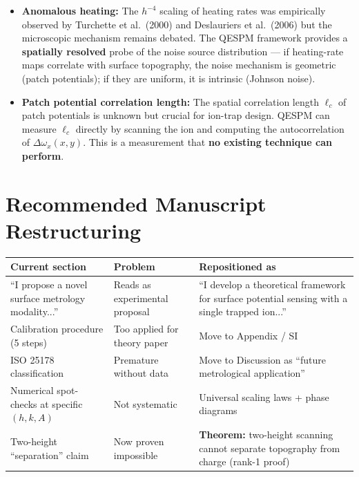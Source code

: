 \documentclass[11pt,a4paper]{article}
\begin{document}
\begin{itemize}
    \item \textbf{Anomalous heating:} The $h^{-4}$ scaling of heating rates
          was empirically observed by Turchette et al.\ (2000) and
          Deslauriers et al.\ (2006) but the microscopic mechanism remains
          debated.  The QESPM framework provides a \textbf{spatially resolved}
          probe of the noise source distribution --- if heating-rate maps
          correlate with surface topography, the noise mechanism is geometric
          (patch potentials); if they are uniform, it is intrinsic (Johnson
          noise).
    
    \item \textbf{Patch potential correlation length:} The spatial
          correlation length $\ell_c$ of patch potentials is unknown but
          crucial for ion-trap design.  QESPM can measure $\ell_c$ directly
          by scanning the ion and computing the autocorrelation of
          $\Delta\omega_x(x,y)$.  This is a measurement that \textbf{no
          existing technique can perform}.
\end{itemize}

\section{Recommended Manuscript Restructuring}

\begin{center}
\begin{tabular}{@{}p{3.5cm}ll@{}}
\toprule
Current section & Problem & Repositioned as \\
\midrule
``I propose a novel surface metrology modality...'' & Reads as experimental proposal &
``I develop a theoretical framework for surface potential sensing with a single trapped ion...'' \\
Calibration procedure (5 steps) & Too applied for theory paper & Move to Appendix / SI \\
ISO 25178 classification & Premature without data & Move to Discussion as ``future metrological application'' \\
Numerical spot-checks at specific $(h,k,A)$ & Not systematic &
Universal scaling laws + phase diagrams \\
Two-height ``separation'' claim & Now proven impossible &
\textbf{Theorem:} two-height scanning cannot separate topography from charge (rank-1 proof) \\
\bottomrule
\end{tabular}
\end{center}
\end{document}
